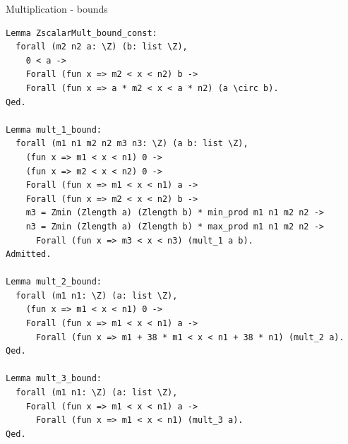 \documentclass[8pt]{beamer}
\begin{document}
%
%





%
%

\begin{frame}[fragile]{Multiplication - bounds}
  \begin{center}
\begin{lstlisting}[language=Coq, caption=Multiplication | Proofs of bounds, label=cod:languageC131]
Lemma ZscalarMult_bound_const:
  forall (m2 n2 a: \Z) (b: list \Z),
    0 < a ->
    Forall (fun x => m2 < x < n2) b ->
    Forall (fun x => a * m2 < x < a * n2) (a \circ b).
Qed.

Lemma mult_1_bound:
  forall (m1 n1 m2 n2 m3 n3: \Z) (a b: list \Z),
    (fun x => m1 < x < n1) 0 ->
    (fun x => m2 < x < n2) 0 ->
    Forall (fun x => m1 < x < n1) a ->
    Forall (fun x => m2 < x < n2) b ->
    m3 = Zmin (Zlength a) (Zlength b) * min_prod m1 n1 m2 n2 ->
    n3 = Zmin (Zlength a) (Zlength b) * max_prod m1 n1 m2 n2 ->
      Forall (fun x => m3 < x < n3) (mult_1 a b).
Admitted.

Lemma mult_2_bound:
  forall (m1 n1: \Z) (a: list \Z),
    (fun x => m1 < x < n1) 0 ->
    Forall (fun x => m1 < x < n1) a ->
      Forall (fun x => m1 + 38 * m1 < x < n1 + 38 * n1) (mult_2 a).
Qed.

Lemma mult_3_bound:
  forall (m1 n1: \Z) (a: list \Z),
    Forall (fun x => m1 < x < n1) a ->
      Forall (fun x => m1 < x < n1) (mult_3 a).
Qed.
\end{lstlisting}

  \end{center}
\end{frame}
\end{document}
